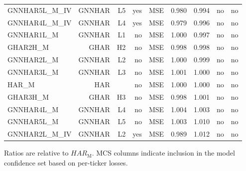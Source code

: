 \documentclass[11pt,a4paper]{article}
\begin{document}
\begin{table}[H]
{\begin{tabular}{lrrrrrrrr}
GNNHAR5L\_M\_IV & GNNHAR & L5 & yes & MSE & 0.980 & 0.994 & no & no \\
GNNHAR4L\_M\_IV & GNNHAR & L4 & yes & MSE & 0.979 & 0.996 & no & no \\
GNNHAR1L\_M & GNNHAR & L1 & no & MSE & 1.000 & 0.997 & no & no \\
GHAR2H\_M & GHAR & H2 & no & MSE & 0.998 & 0.998 & no & no \\
GNNHAR2L\_M & GNNHAR & L2 & no & MSE & 1.000 & 0.999 & no & no \\
GNNHAR3L\_M & GNNHAR & L3 & no & MSE & 1.001 & 1.000 & no & no \\
HAR\_M & HAR &  & no & MSE & 1.000 & 1.000 & no & no \\
GHAR3H\_M & GHAR & H3 & no & MSE & 0.998 & 1.001 & no & no \\
GNNHAR4L\_M & GNNHAR & L4 & no & MSE & 1.004 & 1.003 & no & no \\
GNNHAR5L\_M & GNNHAR & L5 & no & MSE & 1.003 & 1.010 & no & no \\
GNNHAR2L\_M\_IV & GNNHAR & L2 & yes & MSE & 0.989 & 1.012 & no & no \\
\bottomrule
\end{tabular}
}

\vspace{2pt}\begin{minipage}{0.98\textwidth}\footnotesize Ratios are relative to \(HAR_{\mathrm{M}}\). MCS columns indicate inclusion in the model confidence set based on per-ticker losses.\end{minipage}
\end{table}
\end{document}
